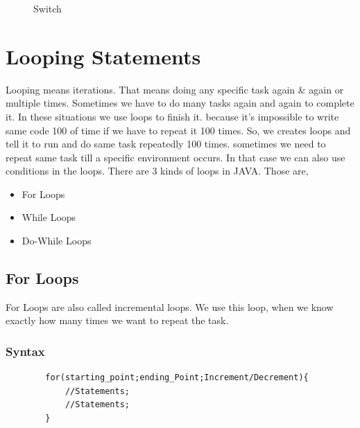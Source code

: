 \documentclass[A4 paper,openany]{book}  %
\begin{document}
% 
% 
\begin{figure}[htbp]
    \begin{center}
        \caption{Switch\cite{Ref3}}
    \end{center}
\end{figure}

\newpage

% 
% 
\section{Looping Statements}
Looping means iterations. That means doing any specific task again \& again or multiple times. Sometimes we have to do many tasks again and again to complete it. In these situations
we use loops to finish it. because it's impossible to write same code 100 of time if we have to repeat it 100 times. So, we creates loops and tell it to run and do same task repeatedly 100 times.
sometimes we need to repeat same task till a specific environment occurs. In that case we can also use conditions in the loops. There are 3 kinds of loops in JAVA. Those are,
\begin{itemize}
    \item For Loops
    \item While Loops
    \item Do-While Loops
\end{itemize}
% 
% 
\subsection{For Loops}
For Loops are also called incremental loops. We use this loop, when we know exactly how many times we want to repeat the task.
% 
% 
\subsubsection{Syntax}
\begin{center}
    \begin{verbatim}
        for(starting_point;ending_Point;Increment/Decrement){
            //Statements;
            //Statements;
        }
    \end{verbatim}
\end{center}
% 
% 
\end{document}
